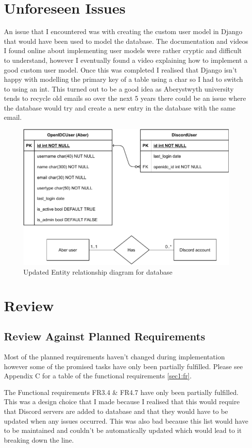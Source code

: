 \section{Unforeseen Issues}\label{sec3:unforeseen}
An issue that I encountered was with creating the custom user model in Django that would have been used to model the database. The documentation and videos I found online about implementing user models were rather cryptic and difficult to understand, however I eventually found a video explaining how to implement a good custom user model. Once this was completed I realised that Django isn't happy with modelling the primary key of a table using a char so I had to switch to using an int. This turned out to be a good idea as Aberystwyth university tends to recycle old emails so over the next 5 years there could be an issue where the database would try and create a new entry in the database with the same email.
\begin{figure}[H]
	\centering
	\includegraphics[width=0.8\linewidth]{Figures/database-er-1}
	\caption{Updated Entity relationship diagram for database}
	\label{fig:database-er-1}
\end{figure}

\section{Review}
\subsection{Review Against Planned Requirements}\label{sec3:pr}
Most of the planned requirements haven't changed during implementation however some of the promised tasks have only been partially fulfilled. Please see Appendix C for a table of the functional requirements \ref{sec1:fr}. 

The Functional requirements FR3.4 \& FR4.7 have only been partially fulfilled. This was a design choice that I made because I realised that this would require that Discord servers are added to database and that they would have to be updated when any issues occurred. This was also bad because this list would have to be maintained and couldn't be automatically updated which would lead to it breaking down the line.

